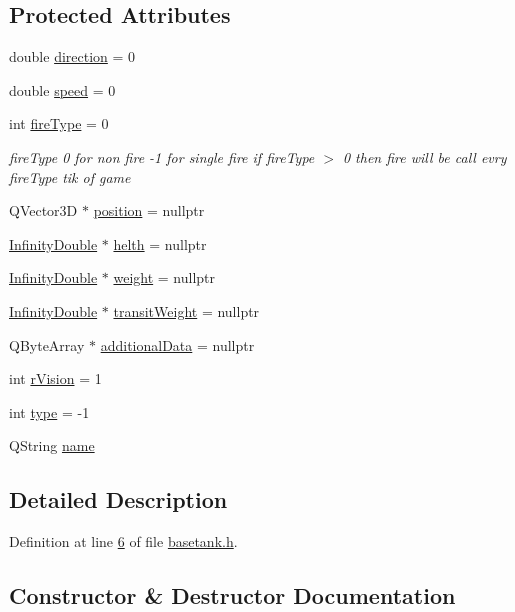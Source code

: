 \subsection*{Protected Attributes}
\begin{DoxyCompactItemize}
\item 
double \hyperlink{a00157_a647e1404ae554cb46d9168f988e05e9e}{direction} = 0
\item 
double \hyperlink{a00157_a075d8661441062552aa5fb22f88ab023}{speed} = 0
\item 
int \hyperlink{a00157_a927e84e94d984793d55d0048b123ae15}{fire\+Type} = 0
\begin{DoxyCompactList}\small\item\em fire\+Type 0 for non fire -\/1 for single fire if fire\+Type $>$ 0 then fire will be call evry fire\+Type tik of game \end{DoxyCompactList}\item 
Q\+Vector3D $\ast$ \hyperlink{a00137_afe080b1942ec40832e94cb884ec87456}{position} = nullptr
\item 
\hyperlink{a00161}{Infinity\+Double} $\ast$ \hyperlink{a00137_a440cf9e7d61c33482ab256a6e944b34d}{helth} = nullptr
\item 
\hyperlink{a00161}{Infinity\+Double} $\ast$ \hyperlink{a00137_a99901016531fd27b9b197dc88d3bfa4a}{weight} = nullptr
\item 
\hyperlink{a00161}{Infinity\+Double} $\ast$ \hyperlink{a00137_a865c937433f7d46665ca17e5adccd9df}{transit\+Weight} = nullptr
\item 
Q\+Byte\+Array $\ast$ \hyperlink{a00137_a4d3547697d3bd0c2d65c83b07b3f8f91}{additional\+Data} = nullptr
\item 
int \hyperlink{a00137_ae0ad3c240950eba352aeb04e6a9296b4}{r\+Vision} = 1
\item 
int \hyperlink{a00137_a73a4ca23072b617f3d17004e3c671bca}{type} = -\/1
\item 
Q\+String \hyperlink{a00137_af35fba4ed599605c3d78b3c3a71fa467}{name}
\end{DoxyCompactItemize}


\subsection{Detailed Description}


Definition at line \hyperlink{a00041_source_l00006}{6} of file \hyperlink{a00041_source}{basetank.\+h}.



\subsection{Constructor \& Destructor Documentation}
\mbox{\label{a00157_ab09f29abaec12417480cae3a5f900a41}} 
